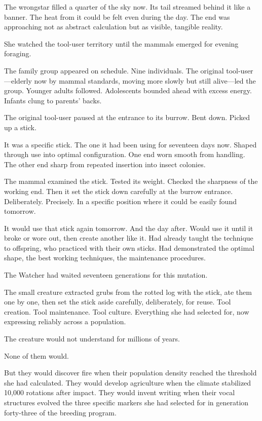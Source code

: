 The wrongstar filled a quarter of the sky now. Its tail streamed behind it like a banner. The heat from it could be felt even during the day. The end was approaching not as abstract calculation but as visible, tangible reality.

She watched the tool-user territory until the mammals emerged for evening foraging.

\scenebreak

The family group appeared on schedule. Nine individuals. The original tool-user—elderly now by mammal standards, moving more slowly but still alive—led the group. Younger adults followed. Adolescents bounded ahead with excess energy. Infants clung to parents' backs.

The original tool-user paused at the entrance to its burrow. Bent down. Picked up a stick.

It was a specific stick. The one it had been using for seventeen days now. Shaped through use into optimal configuration. One end worn smooth from handling. The other end sharp from repeated insertion into insect colonies.

The mammal examined the stick. Tested its weight. Checked the sharpness of the working end. Then it set the stick down carefully at the burrow entrance. Deliberately. Precisely. In a specific position where it could be easily found tomorrow.

It would use that stick again tomorrow. And the day after. Would use it until it broke or wore out, then create another like it. Had already taught the technique to offspring, who practiced with their own sticks. Had demonstrated the optimal shape, the best working techniques, the maintenance procedures.

The Watcher had waited seventeen generations for this mutation.

\scenebreak

The small creature extracted grubs from the rotted log with the stick, ate them one by one, then set the stick aside carefully, deliberately, for reuse. Tool creation. Tool maintenance. Tool culture. Everything she had selected for, now expressing reliably across a population.

The creature would not understand for millions of years.

None of them would.

But they would discover fire when their population density reached the threshold she had calculated. They would develop agriculture when the climate stabilized 10,000 rotations after impact. They would invent writing when their vocal structures evolved the three specific markers she had selected for in generation forty-three of the breeding program.

